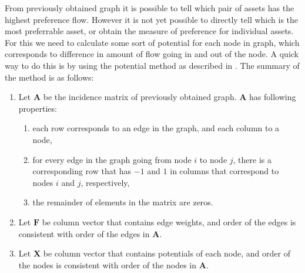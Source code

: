 \documentclass[letterpaper, 10 pt, conference]{ieeeconf}
\begin{document}
  From previously obtained graph it is possible to tell which pair of assets has the highest preference flow.
  However it is not yet possible to directly tell which is the most preferrable asset, or obtain the measure of preference for individual assets.
  For this we need to calculate some sort of potential for each node in graph, which corresponds to difference in amount of flow going in and out of the node.
  A quick way to do this is by using the potential method as described in \cite{caklovic}.
  The summary of the method is as follows:
  \begin{enumerate}
    \item Let $\mathbf{A}$ be the incidence matrix of previously obtained graph. $\mathbf{A}$ has following properties:
    \begin{enumerate}
      \item each row corresponds to an edge in the graph, and each column to a node,
      \item for every edge in the graph going from node $i$ to node $j$, there is a corresponding row that has $-1$ and $1$ in columns that correspond to nodes $i$ and $j$, respectively,
      \item the remainder of elements in the matrix are zeros.
    \end{enumerate}
    \item Let $\mathbf{F}$ be column vector that contains edge weights, and order of the edges is consistent with order of the edges in $\mathbf{A}$.
    
    \item Let $\mathbf{X}$ be column vector that contains potentials of each node, and order of the nodes is consistent with order of the nodes in $\mathbf{A}$.
    

\end{enumerate}
\end{document}
